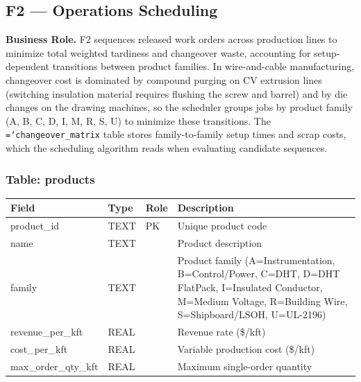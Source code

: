 \documentclass[11pt]{article}
\newcommand{\tfield}[1]{\texttt{\hyphenchar\font=`\-\relax #1}}
\begin{document}
\subsection{F2 --- Operations Scheduling}

\textbf{Business Role.}
F2 sequences released work orders across production lines to minimize total weighted tardiness and changeover waste, accounting for setup-dependent transitions between product families.  In wire-and-cable manufacturing, changeover cost is dominated by compound purging on CV extrusion lines (switching insulation material requires flushing the screw and barrel) and by die changes on the drawing machines, so the scheduler groups jobs by product family (A, B, C, D, I, M, R, S, U) to minimize these transitions.  The \tfield{changeover\_matrix} table stores family-to-family setup times and scrap costs, which the scheduling algorithm reads when evaluating candidate sequences.

\subsubsection*{Table: products}
\begin{table}[H]\centering\small
\begin{tabular}{@{} l l l L{6cm} @{}}
\toprule
\textbf{Field} & \textbf{Type} & \textbf{Role} & \textbf{Description} \\
\midrule
product\_id      & TEXT & PK  & Unique product code \\
name             & TEXT &     & Product description \\
family           & TEXT &     & Product family (A=Instrumentation, B=Control/Power, C=DHT, D=DHT FlatPack, I=Insulated Conductor, M=Medium Voltage, R=Building Wire, S=Shipboard/LSOH, U=UL-2196) \\
revenue\_per\_kft & REAL &    & Revenue rate (\$/kft) \\
cost\_per\_kft   & REAL &     & Variable production cost (\$/kft) \\
max\_order\_qty\_kft & REAL & & Maximum single-order quantity \\
\bottomrule
\end{tabular}
\end{table}
\end{document}
